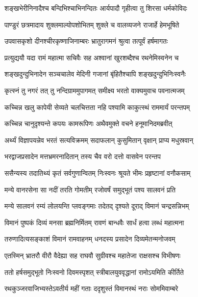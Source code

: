 \twolineshloka
{शङ्खभेरीनिनादैश्च बन्दिभिश्चाभिनन्दितः}
{आर्यपादौ गृहीत्वा तु शिरसा धर्मकोविदः} %

\twolineshloka
{पाण्डुरं छत्रमादाय शुक्लमाल्योपशोभितम्}
{शुक्ले च वालव्यजने राजार्हे हेमभूषिते} %

\twolineshloka
{उपवासकृशो दीनश्चीरकृष्णाजिनाम्बरः}
{भ्रातुरागमनं श्रुत्वा तत्पूर्वं हर्षमागतः} %

\twolineshloka
{प्रत्युद्ययौ यदा रामं महात्मा सचिवैः सह}
{अश्वानां खुरशब्दैश्च रथनेमिस्वनेन च} %

\twolineshloka
{शङ्खदुन्दुभिनादेन सञ्चचालेव मेदिनी}
{गजानां बृंहितैश्चापि शङ्खदुन्दुभिनिःस्वनैः} %

\twolineshloka
{कृत्स्नं तु नगरं तत् तु नन्दिग्राममुपागमत्}
{समीक्ष्य भरतो वाक्यमुवाच पवनात्मजम्} %

\twolineshloka
{कच्चिन्न खलु कापेयी सेव्यते चलचित्तता}
{नहि पश्यामि काकुत्स्थं राममार्यं परन्तपम्} %

\twolineshloka
{कच्चिन्न चानुदृश्यन्ते कपयः कामरूपिणः}
{अथैवमुक्ते वचने हनूमानिदमब्रवीत्} %

\twolineshloka
{अर्थ्यं विज्ञापयन्नेव भरतं सत्यविक्रमम्}
{सदाफलान् कुसुमितान् वृक्षान् प्राप्य मधुस्रवान्} %

\twolineshloka
{भरद्वाजप्रसादेन मत्तभ्रमरनादितान्}
{तस्य चैव वरो दत्तो वासवेन परन्तप} %

\twolineshloka
{ससैन्यस्य तदातिथ्यं कृतं सर्वगुणान्वितम्}
{निःस्वनः श्रूयते भीमः प्रहृष्टानां वनौकसाम्} %

\twolineshloka
{मन्ये वानरसेना सा नदीं तरति गोमतीम्}
{रजोवर्षं समुद्भूतं पश्य सालवनं प्रति} %

\twolineshloka
{मन्ये सालवनं रम्यं लोलयन्ति प्लवङ्गमाः}
{तदेतद् दृश्यते दूराद् विमानं चन्द्रसन्निभम्} %

\twolineshloka
{विमानं पुष्पकं दिव्यं मनसा ब्रह्मनिर्मितम्}
{रावणं बान्धवैः सार्धं हत्वा लब्धं महात्मना} %

\twolineshloka
{तरुणादित्यसङ्काशं विमानं रामवाहनम्}
{धनदस्य प्रसादेन दिव्यमेतन्मनोजवम्} %

\twolineshloka
{एतस्मिन् भ्रातरौ वीरौ वैदेह्या सह राघवौ}
{सुग्रीवश्च महातेजा राक्षसश्च विभीषणः} %

\twolineshloka
{ततो हर्षसमुद्भूतो निःस्वनो दिवमस्पृशत्}
{स्त्रीबालयुववृद्धानां रामोऽयमिति कीर्तिते} %

\twolineshloka
{रथकुञ्जरवाजिभ्यस्तेऽवतीर्य महीं गताः}
{ददृशुस्तं विमानस्थं नराः सोममिवाम्बरे} %

